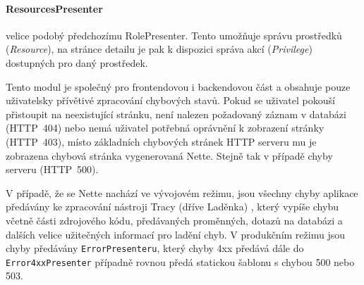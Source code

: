 \paragraph{ResourcesPresenter} velice podobý předchozímu RolePresenter. Tento umožňuje správu prostředků (\textit{Resource}), na stránce detailu je pak k dispozici správa akcí (\textit{Privilege}) dostupných pro daný prostředek.

Tento modul je společný pro frontendovou i backendovou část a obsahuje pouze uživatelsky přívětivé zpracování chybových stavů. Pokud se uživatel pokouší přistoupit na neexistující stránku, není nalezen požadovaný záznam v databázi (HTTP~404) nebo nemá uživatel potřebná oprávnění k zobrazení stránky (HTTP~403), místo základních chybových stránek HTTP serveru mu je zobrazena chybová stránka vygenerovaná Nette. Stejně tak v případě chyby serveru (HTTP~500). 

V případě, že se Nette nachází ve vývojovém režimu, jsou všechny chyby aplikace předávány ke zpracování nástroji Tracy (dříve Laděnka) \cite{Tracy}, který vypíše chybu včetně části zdrojového kódu, předávaných proměnných, dotazů na databázi a dalších velice užitečných informací pro ladění chyb. V produkčním režimu jsou chyby předávány \texttt{ErrorPresenteru}, který chyby 4xx předává dále do \texttt{Error4xxPresenter} případně rovnou předá statickou šablonu s chybou 500 nebo 503.

